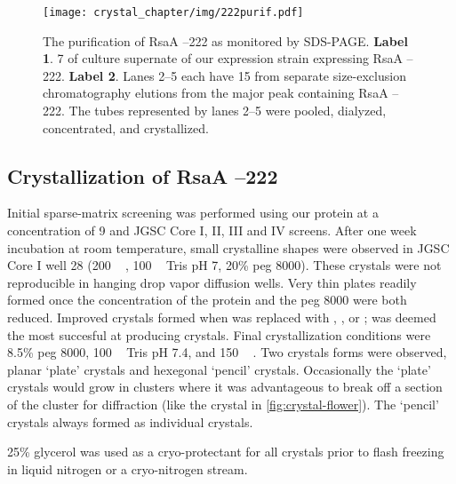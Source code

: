 \begin{figure}[htb]
  	\begin{center}
   		\texttt{[image: crystal\_chapter/img/222purif.pdf]}
   	\end{center}
   	\caption[Purification of RsaA --222 shown by \ac{SDS-PAGE}]{
      The purification of RsaA --222 as monitored by \ac{SDS-PAGE}. \textbf{Label 1}. 7 \microlitre{} of culture supernate of our \caulobacter{} expression strain expressing RsaA --222. \textbf{Label 2}. Lanes 2--5 each have 15 \microlitre{} from separate  size-exclusion chromatography elutions from the major peak containing RsaA --222. The tubes represented by lanes 2--5 were pooled, dialyzed, concentrated, and crystallized.
}
   	\label{fig:222purif}
\end{figure}   

\subsection{Crystallization of RsaA --222}\label{crystallization}

Initial sparse-matrix screening was performed using our protein at a
concentration of 9 \mgperml and JGSC Core I, II, III and IV screens. %
 After one week incubation at room temperature, small crystalline shapes were
observed in JGSC Core I well 28 (200 \si{\milli\molar}  , 100 \si{\milli\molar} Tris pH 7, 20\% \ac{peg}
8000). These crystals were not reproducible in hanging drop vapor
diffusion wells. Very thin plates readily formed once the concentration
of the protein and the \ac{peg} 8000 were both reduced. Improved crystals
formed when  was replaced with , , or ;  was
deemed the most succesful at producing crystals. Final crystallization
conditions were 8.5\% \ac{peg} 8000, 100 \si{\milli\molar} Tris pH 7.4, and 150 \si{\milli\molar} .
Two crystals forms were observed, planar `plate' crystals and hexegonal
`pencil' crystals. Occasionally the `plate' crystals would grow in clusters where it was advantageous to break off a section of the cluster for diffraction (like the crystal in \cref{fig:crystal-flower}). The `pencil' crystals always formed as individual crystals.

 25\% glycerol was used as a cryo-protectant for all
crystals prior to flash freezing in liquid nitrogen or a cryo-nitrogen stream.

